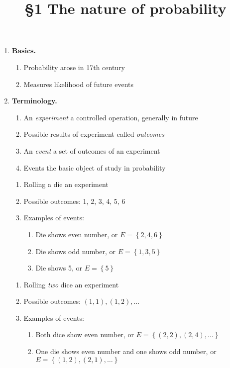 \documentclass{ximera}
\title{\S1 The nature of probability}
\begin{document}
\maketitle
\begin{enumerate}

\item{\bf Basics.}
\begin{enumerate}
\item Probability arose in 17th century
\item Measures likelihood of future events
\end{enumerate}

\item{\bf Terminology.}
\begin{enumerate}
\item An {\em experiment} a controlled operation,
generally in future
\item Possible results of experiment called {\em outcomes}
\item An {\em event} a set of outcomes of an experiment
\item Events the basic object of study in probability
\end{enumerate}

\begin{example}
\begin{enumerate}
\item Rolling a die an experiment
\item Possible outcomes: 1, 2, 3, 4, 5, 6
\item Examples of events:
\begin{enumerate}
\item Die shows even number, or $E=\left\{2,4,6\right\}$
\item Die shows odd number, or $E=\left\{1,3,5\right\}$
\item Die shows 5, or $E=\left\{5\right\}$
\end{enumerate}
\end{enumerate}
\end{example}

\begin{example}
\begin{enumerate}
\item Rolling {\em two} dice an experiment
\item Possible outcomes: $\left(1,1\right),\left(1,2\right),\ldots$
\item Examples of events:
\begin{enumerate}
\item Both dice show even number, or $E=\left\{\left(2,2\right),
\left(2,4\right),\ldots\right\}$
\item One die shows even number and one shows odd number,
or $E=\left\{\left(1,2\right),\left(2,1\right),\ldots\right\}$
\end{enumerate}
\end{enumerate}
\end{example}


\end{enumerate}
\end{document}
